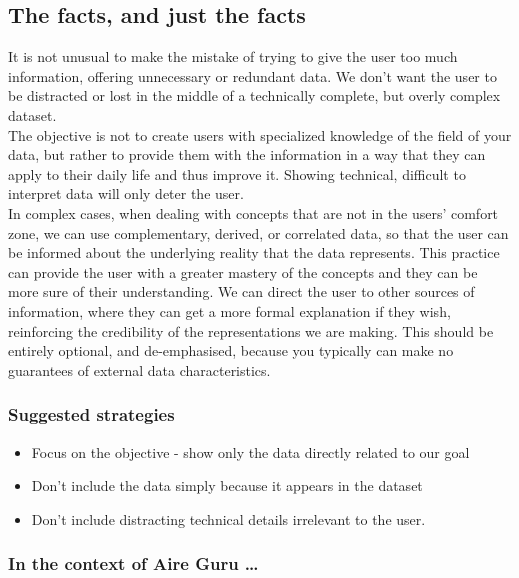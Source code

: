 \subsection{The facts, and just the facts}

It is not unusual to make the mistake of trying to give the user too much information, offering unnecessary or redundant data.
We don't want the user to be distracted or lost in the middle of a technically complete, but overly complex dataset. \\

The objective is not to create users with specialized knowledge of the field of your data, but rather to provide them with the
information in a way that they can apply to their daily life and thus improve it. Showing
technical, difficult to interpret data will only deter the user. \\

In complex cases, when dealing with concepts that are not in the users' comfort zone, we can use complementary, derived, or correlated data,
so that the user can be informed about the underlying reality that the data represents.
This practice can provide the user with a greater mastery of the concepts and they can be more
sure of their understanding. We can direct the user to other sources of information, where they can
get a more formal explanation if they wish, reinforcing the credibility of the representations we are making.
This should be entirely optional, and de-emphasised, because you typically can make no guarantees of external data characteristics.

\subsubsection*{Suggested strategies}

\begin{itemize}
    \item Focus on the objective - show only the data directly related to our goal
    \item Don't include the data simply because it appears in the dataset
    \item Don't include distracting technical details irrelevant to the user.
\end{itemize}

\subsubsection*{In the context of Aire Guru \ldots} 

